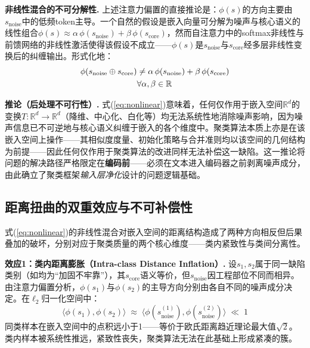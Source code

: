\documentclass[10.5pt,compsoc,UTF8]{CjC}
\theoremstyle{mystyle}
\newcommand{\R}{\mathbb{R}}
\begin{document}
\textbf{非线性混合的不可分解性.} 上述注意力偏置的直接推论是：$\phi(s)$的方向主要由$s_{\text{noise}}$中的低频token主导。一个自然的假设是嵌入向量可分解为噪声与核心语义的线性组合$\phi(s) \approx \alpha\,\phi(s_{\text{noise}}) + \beta\,\phi(s_{\text{core}})$，然而自注意力中的softmax非线性与前馈网络的非线性激活使得该假设不成立——$\phi(s)$是$s_{\text{noise}}$与$s_{\text{core}}$经多层非线性变换后的纠缠输出。形式化地：
\begin{equation}
\begin{aligned}
\phi(s_{\text{noise}} \oplus s_{\text{core}}) &\neq \alpha\, \phi(s_{\text{noise}}) + \beta\, \phi(s_{\text{core}}) \\
& \mathrlap{\forall \alpha,\beta \in \R}
\end{aligned}
\label{eq:nonlinear}
\end{equation}

\textbf{推论（后处理不可行性）.} 式(\ref{eq:nonlinear})意味着，任何仅作用于嵌入空间$\R^d$的变换$T: \R^d \to \R^d$（降维、中心化、白化等）均无法系统性地消除噪声影响，因为噪声信息已不可逆地与核心语义纠缠于嵌入的各个维度中。聚类算法本质上亦是在该嵌入空间上操作——其相似度度量、初始化策略与合并准则均以该空间的几何结构为前提——因此任何仅作用于聚类算法的改进同样无法补偿这一缺陷。这一推论将问题的解决路径严格限定在\textbf{编码前}——必须在文本进入编码器之前剥离噪声成分，由此确立了聚类框架\emph{输入层净化}设计的问题逻辑基础。

{\heiti \subsection{距离扭曲的双重效应与不可补偿性}}

式(\ref{eq:nonlinear})的非线性混合对嵌入空间的距离结构造成了两种方向相反但后果叠加的破坏，分别对应于聚类质量的两个核心维度——类内紧致性与类间分离性。

\textbf{效应1：类内距离膨胀（Intra-class Distance Inflation）.} 设$s_1, s_2$属于同一缺陷类别（如均为``加固不牢靠''），其$s_{\text{core}}$语义等价，但$s_{\text{noise}}$因工程部位不同而相异。由注意力偏置分析，$\phi(s_1)$与$\phi(s_2)$的主导方向分别由各自不同的噪声成分决定。在$\ell_2$归一化空间中：
\begin{equation}
\langle \phi(s_1), \phi(s_2) \rangle \;\approx\; \langle \phi(s_{\text{noise}}^{(1)}), \phi(s_{\text{noise}}^{(2)}) \rangle \;\ll\; 1
\label{eq:intra}
\end{equation}
同类样本在嵌入空间中的点积远小于1——等价于欧氏距离趋近理论最大值$\sqrt{2}$。类内样本被系统性推远，紧致性丧失，聚类算法无法在此基础上形成紧凑的簇。
\end{document}
